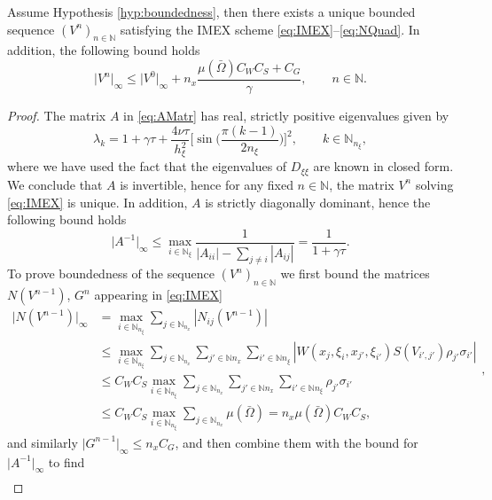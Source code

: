 \documentclass[a4paper,final]{siamart190516}
\newcommand{\Nb}{\mathbb{N}}
\begin{document}
\begin{lemma}\label{lem:IMEXboundedness} 
  Assume Hypothesis \ref{hyp:boundedness}, then there exists a unique bounded
  sequence $(V^n)_{n\in\Nb}$ satisfying
  the IMEX scheme \eqref{eq:IMEX}--\eqref{eq:NQuad}. In
  addition, the following bound holds
  \[
    \vert V^n \vert_\infty \leq \vert V^0 \vert_\infty + 
    n_x \frac{ \mu(\bar\Omega) C_W C_S + C_G}{\gamma},
    \qquad n \in \Nb.
  \]
\end{lemma}
\begin{proof}
  The matrix $A$ in \eqref{eq:AMatr} has real, strictly positive eigenvalues given
  by
  \[
    \lambda_k = 1 + \gamma \tau + \frac{4\nu \tau}{h_\xi^2} 
    \bigg[ \sin \bigg( \frac{\pi(k-1)}{2n_\xi} \bigg) \bigg]^2, \qquad k \in
    \Nb_{n_\xi},
  \]
  where we have used the fact that the eigenvalues of $D_{\xi \xi}$ are known in closed form.
  We conclude that $A$ is invertible, hence for any fixed $n \in \Nb$,
  the matrix $V^n$ solving \eqref{eq:IMEX} is unique. In addition, $A$ is
  strictly diagonally dominant, hence the following bound holds~\cite{varah75}
  \begin{equation}\label{eq:invABound}
  \vert A^{-1} \vert_\infty \leq \max_{i \in \Nb_\xi} \frac{1}{|A_{ii}| - \sum_{j
  \neq i} |A_{ij}|} = \frac{1}{1+ \gamma \tau}.
  \end{equation}
  To prove boundedness of the sequence $(V^n)_{n \in \Nb}$ we first bound the
  matrices $N(V^{n-1})$, $G^n$ appearing in \eqref{eq:IMEX}
  \[
    \begin{aligned}
    \vert N(V^{n-1}) \vert_\infty 
    & = \max_{i \in \Nb_{n_\xi}} \sum_{j \in \Nb_{n_x}} |N_{ij}(V^{n-1})| \\
    & \leq
    \max_{i \in \Nb_{n_\xi}} \sum_{j \in \Nb_{n_x}} 
                             \sum_{j' \in \Nb{n_x}} \sum_{i' \in \Nb{n_\xi}}
                              |W(x_j,\xi_i,x_{j'},\xi_{i'}) S(V_{i',j'}) \rho_{j'}\sigma_{i'}| \\
    & \leq C_W C_S
    \max_{i \in \Nb_{n_\xi}} \sum_{j \in \Nb_{n_x}} 
                   \sum_{j' \in \Nb{n_x}} \sum_{i' \in \Nb{n_\xi}}
		  \rho_{j'}\sigma_{i'} \\
    & \leq C_W C_S
    \max_{i \in \Nb_{n_\xi}} \sum_{j \in \Nb_{n_x}} \mu(\bar\Omega)
    = n_x \mu(\bar\Omega) C_W C_S,
    \end{aligned},
  \]
  and similarly $\vert G^{n-1} \vert_\infty \leq n_x C_G$, and then combine
  them with the bound for $\vert A^{-1}\vert_\infty$ to find
  \[
    \begin{aligned}

\end{aligned}\]
\end{proof}
\end{document}

